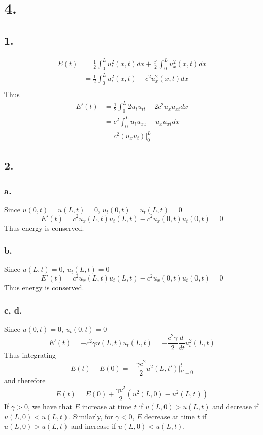 \documentclass[11pt]{article}
\theoremstyle{mystyle}
\theoremstyle{definition}
\begin{document}
\section*{4.}
\subsection*{1.}
\begin{align*}
  E(t) &= \displaystyle\frac{1}{2} \int_0^L u_t^2(x,t)dx + \displaystyle\frac{c^2}{2} \int_0^L u_x^2(x,t) dx \\
  &= \displaystyle\frac{1}{2} \int_0^L u_t^2(x,t) + c^2 u_x^2(x,t)dx \\
\end{align*}
Thus 
\begin{align*} 
  E'(t) &= \displaystyle\frac{1}{2} \int_0^L 2u_t u_{tt} + 2c^2 u_x u_{xt} dx \\
  &= c^2 \int_0^L u_t u_{xx} + u_x u_{xt} dx \\
  &= c^2 \left. \left( u_x u_t \right)\right|_0^L
\end{align*}
\subsection*{2.}
\subsubsection*{a.}
Since $u(0,t) = u(L,t) = 0$, $u_t(0,t) = u_t(L,t) = 0$
\[
  E'(t) = c^2 u_x(L,t)u_t(L,t) - c^2u_x(0,t)u_t(0,t) = 0
\]
Thus energy is conserved.
\subsubsection*{b.}
Since $u(L,t) = 0$, $u_t(L,t) = 0$
\[
  E'(t) = c^2 u_x(L,t)u_t(L,t) - c^2u_x(0,t)u_t(0,t) = 0
\]
Thus energy is conserved.
\subsubsection*{c, d.}
Since $u(0,t) = 0$, $u_t(0,t) = 0$
\[
  E'(t) = -c^2 \gamma u(L,t) u_t(L,t) = -\displaystyle\frac{c^2\gamma}{2} \displaystyle\frac{d}{dt} u_t^2(L,t)
\]
Thus integrating
\[
  E(t) - E(0) =  -\displaystyle\frac{\gamma c^2}{2} u^2(L,t')|_{t' = 0}^t
\]
and therefore
\[
  E(t) = E(0) + \displaystyle\frac{\gamma c^2}{2} (u^2(L,0) - u^2(L,t))
\]
If $\gamma > 0$, we have that $E$ increase at time $t$ if $u(L,0) > u(L,t)$ and decrease if $u(L,0) < u(L,t)$. Similarly, for $\gamma <0$, $E$ decrease at time $t$ if $u(L,0) > u(L,t)$ and increase if $u(L,0) < u(L,t)$. 
\newpage
\end{document}

